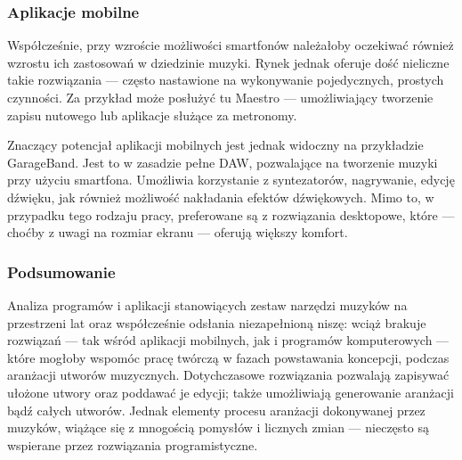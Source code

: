 \documentclass[12pt]{article}
\begin{document}
\subsubsection{Aplikacje mobilne}
Współcześnie, przy wzroście możliwości smartfonów należałoby oczekiwać również wzrostu ich zastosowań w dziedzinie
muzyki. Rynek jednak oferuje dość nieliczne takie rozwiązania — często nastawione na wykonywanie pojedycznych,
prostych czynności. Za przykład może posłużyć tu Maestro — umożliwiający tworzenie zapisu nutowego lub aplikacje
służące za metronomy.

Znaczący potencjał aplikacji mobilnych jest jednak widoczny na przykładzie GarageBand. Jest to w zasadzie pełne DAW,
pozwalające na tworzenie muzyki przy użyciu smartfona. Umożliwia korzystanie z syntezatorów, nagrywanie, edycję dźwięku,
jak również możliwość nakładania efektów dźwiękowych. Mimo to, w przypadku tego rodzaju pracy, preferowane są
z rozwiązania desktopowe, które — choćby z uwagi na rozmiar ekranu — oferują większy komfort.

\subsubsection{Podsumowanie}
Analiza programów i aplikacji stanowiących zestaw narzędzi muzyków na przestrzeni lat oraz współcześnie
odsłania niezapełnioną niszę: wciąż brakuje rozwiązań — tak wśród aplikacji mobilnych, jak i programów komputerowych —
które mogłoby wspomóc pracę twórczą w fazach powstawania koncepcji, podczas aranżacji utworów muzycznych. Dotychczasowe
rozwiązania pozwalają zapisywać ułożone utwory oraz poddawać je edycji; także umożliwiają generowanie aranżacji bądź całych
utworów. Jednak elementy procesu aranżacji dokonywanej przez muzyków, wiążące się z mnogością pomysłów i licznych zmian —
nieczęsto są wspierane przez rozwiązania programistyczne.
\end{document}

